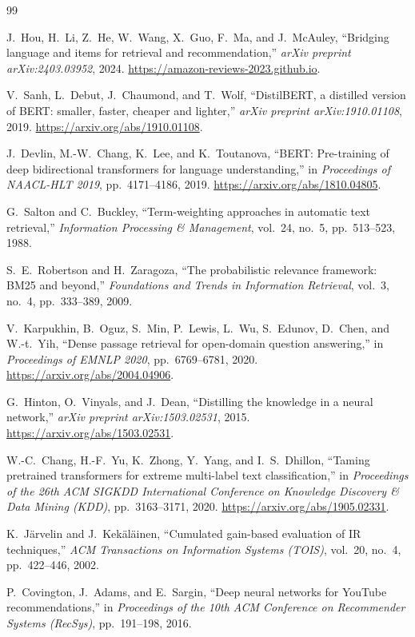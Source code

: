 \documentclass[11pt]{article}
\begin{document}
\begin{thebibliography}{99}

J.~Hou, H.~Li, Z.~He, W.~Wang, X.~Guo, F.~Ma, and J.~McAuley,
``Bridging language and items for retrieval and recommendation,''
\emph{arXiv preprint arXiv:2403.03952}, 2024.
\url{https://amazon-reviews-2023.github.io}.

V.~Sanh, L.~Debut, J.~Chaumond, and T.~Wolf,
``DistilBERT, a distilled version of BERT: smaller, faster, cheaper and lighter,''
\emph{arXiv preprint arXiv:1910.01108}, 2019.
\url{https://arxiv.org/abs/1910.01108}.

J.~Devlin, M.-W.~Chang, K.~Lee, and K.~Toutanova,
``BERT: Pre-training of deep bidirectional transformers for language understanding,''
in \emph{Proceedings of NAACL-HLT 2019}, pp.~4171--4186, 2019.
\url{https://arxiv.org/abs/1810.04805}.

G.~Salton and C.~Buckley,
``Term-weighting approaches in automatic text retrieval,''
\emph{Information Processing \& Management}, vol.~24, no.~5, pp.~513--523, 1988.

S.~E.~Robertson and H.~Zaragoza,
``The probabilistic relevance framework: BM25 and beyond,''
\emph{Foundations and Trends in Information Retrieval}, vol.~3, no.~4, pp.~333--389, 2009.

V.~Karpukhin, B.~Oguz, S.~Min, P.~Lewis, L.~Wu, S.~Edunov, D.~Chen, and W.-t.~Yih,
``Dense passage retrieval for open-domain question answering,''
in \emph{Proceedings of EMNLP 2020}, pp.~6769--6781, 2020.
\url{https://arxiv.org/abs/2004.04906}.

G.~Hinton, O.~Vinyals, and J.~Dean,
``Distilling the knowledge in a neural network,''
\emph{arXiv preprint arXiv:1503.02531}, 2015.
\url{https://arxiv.org/abs/1503.02531}.

W.-C.~Chang, H.-F.~Yu, K.~Zhong, Y.~Yang, and I.~S.~Dhillon,
``Taming pretrained transformers for extreme multi-label text classification,''
in \emph{Proceedings of the 26th ACM SIGKDD International Conference on Knowledge Discovery \& Data Mining (KDD)}, pp.~3163--3171, 2020.
\url{https://arxiv.org/abs/1905.02331}.

K.~J\"{a}rvelin and J.~Kek\"{a}l\"{a}inen,
``Cumulated gain-based evaluation of IR techniques,''
\emph{ACM Transactions on Information Systems (TOIS)}, vol.~20, no.~4, pp.~422--446, 2002.

P.~Covington, J.~Adams, and E.~Sargin,
``Deep neural networks for YouTube recommendations,''
in \emph{Proceedings of the 10th ACM Conference on Recommender Systems (RecSys)}, pp.~191--198, 2016.


\end{thebibliography}
\end{document}
